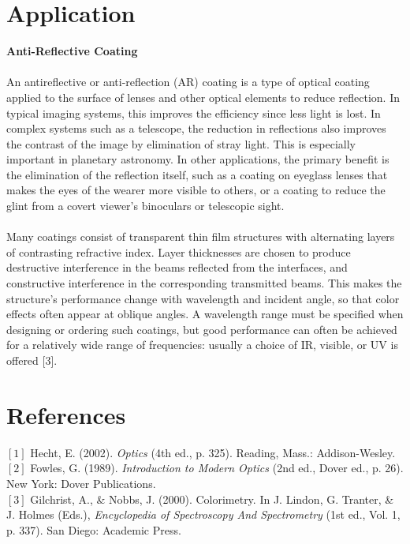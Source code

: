 \documentclass[a4paper,12pt]{report}
\begin{document}
\chapter{Application}
\textbf{Anti-Reflective Coating}\\\\
An antireflective or anti-reflection (AR) coating is a type of optical coating applied to the surface of lenses and other optical elements to reduce reflection. In typical imaging systems, this improves the efficiency since less light is lost. In complex systems such as a telescope, the reduction in reflections also improves the contrast of the image by elimination of stray light. This is especially important in planetary astronomy. In other applications, the primary benefit is the elimination of the reflection itself, such as a coating on eyeglass lenses that makes the eyes of the wearer more visible to others, or a coating to reduce the glint from a covert viewer's binoculars or telescopic sight.\\\\
Many coatings consist of transparent thin film structures with alternating layers of contrasting refractive index. Layer thicknesses are chosen to produce destructive interference in the beams reflected from the interfaces, and constructive interference in the corresponding transmitted beams. This makes the structure's performance change with wavelength and incident angle, so that color effects often appear at oblique angles. A wavelength range must be specified when designing or ordering such coatings, but good performance can often be achieved for a relatively wide range of frequencies: usually a choice of IR, visible, or UV is offered [3].
\chapter{References}
$[1]$ Hecht, E. (2002). \textit{Optics} (4th ed., p. 325). Reading, Mass.: Addison-Wesley.\\
$[2]$ Fowles, G. (1989). \textit{Introduction to Modern Optics} (2nd ed., Dover ed., p. 26). New York: Dover Publications.\\
$[3]$ Gilchrist, A., \& Nobbs, J. (2000). Colorimetry. In J. Lindon, G. Tranter, \& J. Holmes (Eds.), \textit{Encyclopedia of Spectroscopy And Spectrometry} (1st ed., Vol. 1, p. 337). San Diego: Academic Press.
\end{document}

